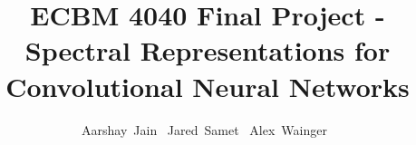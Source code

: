 \documentclass[10pt,journal,compsoc]{IEEEtran}
\begin{document}
%
\title{ECBM 4040 Final Project - Spectral Representations for Convolutional Neural Networks}
%
%
%
%

\author{Aarshay~Jain~
        Jared~Samet~
        Alex~Wainger~%
}

%
%
\end{document}
